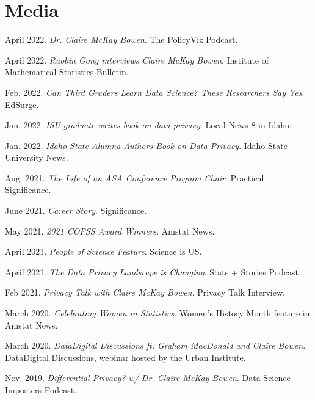 \documentclass[11pt, letterpaper, roman]{moderncv} %
\begin{document}
\section{Media}
\begin{etaremune}[topsep=0pt, itemsep=2pt, partopsep=0pt, parsep=0pt]
    \item April 2022. \textit{Dr. Claire McKay Bowen}. The PolicyViz Podcast.
    
    \item April 2022. \textit{Ruobin Gong interviews Claire McKay Bowen}. Institute of Mathematical Statistics Bulletin.
    
    \item Feb. 2022. \textit{Can Third Graders Learn Data Science? These Researchers Say Yes}. EdSurge.
    
    \item Jan. 2022. \textit{ISU graduate writes book on data privacy}. Local News 8 in Idaho.
    
    \item Jan. 2022. \textit{Idaho State Alumna Authors Book on Data Privacy}. Idaho State University News.

    \item Aug. 2021. \textit{The Life of an ASA Conference Program Chair}. Practical Significance.    

    \item June 2021. \textit{Career Story}. Significance.
    
    \item May 2021. \textit{2021 COPSS Award Winners}. Amstat News.
    
    \item April 2021. \textit{People of Science Feature}. Science is US.
    
    \item April 2021. \textit{The Data Privacy Landscape is Changing}. Stats + Stories Podcast.
    
    \item Feb 2021. \textit{Privacy Talk with Claire McKay Bowen}. Privacy Talk Interview.

    \item March 2020. \textit{Celebrating Women in Statistics}. Women's History Month feature in Amstat News.

    \item March 2020. \textit{Data\@Urban Digital Discussions ft. Graham MacDonald and Claire Bowen}. Data\@Urban Digital Discussions, webinar hosted by the Urban Institute.
    
    \item Nov. 2019. \textit{Differential Privacy? w/ Dr. Claire McKay Bowen}. Data Science Imposters Podcast.
\end{etaremune}
\end{document}
